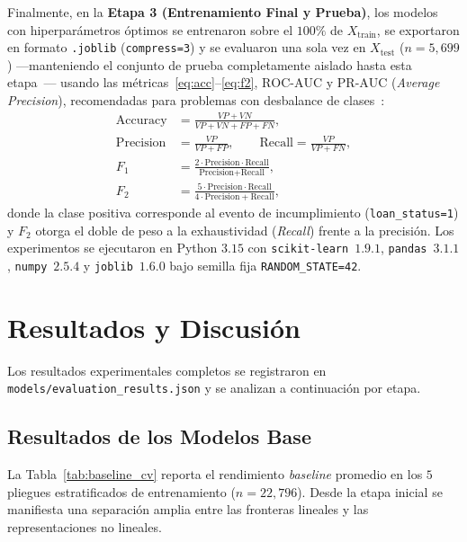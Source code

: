 \documentclass[conference]{IEEEtran}
\begin{document}
Finalmente, en la \textbf{Etapa 3 (Entrenamiento Final y Prueba)}, los modelos con hiperparámetros óptimos se entrenaron sobre el $100\%$ de $X_{\text{train}}$, se exportaron en formato \texttt{.joblib} (\texttt{compress=3}) y se evaluaron una sola vez en $X_{\text{test}}$ ($n=5{,}699$) —manteniendo el conjunto de prueba completamente aislado hasta esta etapa~\cite{muller2016introduction}— usando las métricas~\eqref{eq:acc}--\eqref{eq:f2}, $\text{ROC-AUC}$ y $\text{PR-AUC}$ (\textit{Average Precision}), recomendadas para problemas con desbalance de clases~\cite{muller2016introduction}:
\begin{align}
\text{Accuracy} &= \frac{VP + VN}{VP + VN + FP + FN}, \label{eq:acc} \\
\text{Precision} &= \frac{VP}{VP + FP}, \qquad \text{Recall} = \frac{VP}{VP + FN}, \label{eq:pr_rec} \\
F_1 &= \frac{2 \cdot \text{Precision} \cdot \text{Recall}}{\text{Precision} + \text{Recall}}, \label{eq:f1} \\
F_2 &= \frac{5 \cdot \text{Precision} \cdot \text{Recall}}{4 \cdot \text{Precision} + \text{Recall}}, \label{eq:f2}
\end{align}
donde la clase positiva corresponde al evento de incumplimiento (\texttt{loan\_status=1}) y $F_2$ otorga el doble de peso a la exhaustividad (\textit{Recall}) frente a la precisión. Los experimentos se ejecutaron en Python $3.15$ con \texttt{scikit-learn}~$1.9.1$, \texttt{pandas}~$3.1.1$, \texttt{numpy}~$2.5.4$ y \texttt{joblib}~$1.6.0$ bajo semilla fija \texttt{RANDOM\_STATE=42}.

\section{Resultados y Discusión}

Los resultados experimentales completos se registraron en \texttt{models/evaluation\_results.json} y se analizan a continuación por etapa.

\subsection{Resultados de los Modelos Base}

La Tabla~\ref{tab:baseline_cv} reporta el rendimiento \textit{baseline} promedio en los $5$ pliegues estratificados de entrenamiento ($n=22{,}796$). Desde la etapa inicial se manifiesta una separación amplia entre las fronteras lineales y las representaciones no lineales.
\end{document}
